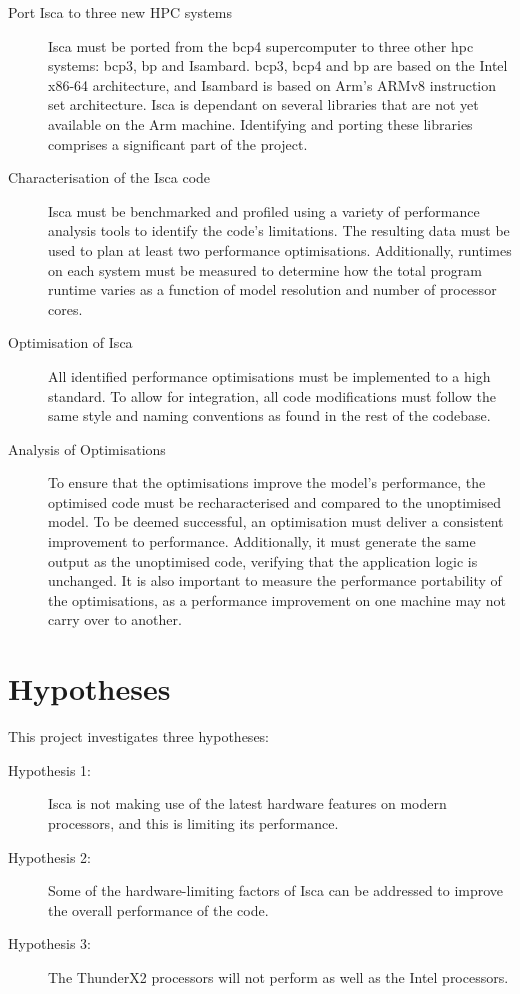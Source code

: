 \documentclass[a4paper,11pt]{report}
\begin{document}
\begin{description}
	\item[Port Isca to three new HPC systems] Isca must be ported from the \gls{bcp4} supercomputer to three other \gls{hpc} systems: \gls{bcp3}, \gls{bp} and Isambard. \gls{bcp3}, \gls{bcp4} and \gls{bp} are based on the Intel x86-64 architecture, and Isambard is based on Arm's ARMv8 instruction set architecture. Isca is dependant on several libraries that are not yet available on the Arm machine. Identifying and porting these libraries comprises a significant part of the project.
	\item[Characterisation of the Isca code] Isca must be benchmarked and profiled using a variety of performance analysis tools to identify the code’s limitations. The resulting data must be used to plan at least two performance optimisations. Additionally, runtimes on each system must be measured to determine how the total program runtime varies as a function of model resolution and number of processor cores. 
	
	\item[Optimisation of Isca] All identified performance optimisations must be implemented to a high standard. To allow for integration, all code modifications must follow the same style and naming conventions as found in the rest of the codebase.
	
	\item[Analysis of Optimisations] To ensure that the optimisations improve the model’s performance, the optimised code must be recharacterised and compared to the unoptimised model. To be deemed successful, an optimisation must deliver a consistent improvement to performance. Additionally, it must generate the same output as the unoptimised code, verifying that the application logic is unchanged. It is also important to measure the performance portability of the optimisations, as a performance improvement on one machine may not carry over to another.
	
\end{description}

\section{Hypotheses}
This project investigates three hypotheses:

\begin{description}

\item[Hypothesis 1: ] Isca is not making use of the latest hardware features on modern processors, and this is limiting its performance. 

\item[Hypothesis 2: ] Some of the hardware-limiting factors of Isca can be addressed to improve the overall performance of the code.

\item[Hypothesis 3: ] The ThunderX2 processors will not perform as well as the Intel processors.

\end{description}
\end{document}
